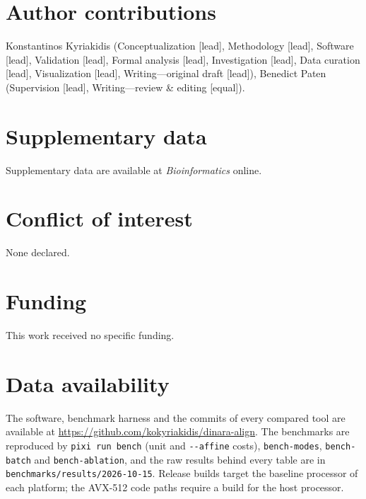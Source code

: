 \section*{Author contributions}
Konstantinos Kyriakidis (Conceptualization [lead], Methodology [lead], Software [lead], Validation [lead], Formal analysis [lead], Investigation [lead], Data curation [lead], Visualization [lead], Writing—original draft [lead]), Benedict Paten (Supervision [lead], Writing—review \& editing [equal]).

\section*{Supplementary data}
Supplementary data are available at \emph{Bioinformatics} online.

\section*{Conflict of interest}
None declared.

\section*{Funding}
This work received no specific funding.

\section*{Data availability}
The software, benchmark harness and the commits of every compared tool are available at \url{https://github.com/kokyriakidis/dinara-align}. The benchmarks are reproduced by \texttt{pixi run bench} (unit and \texttt{-{}-affine} costs), \texttt{bench-modes}, \texttt{bench-batch} and \texttt{bench-ablation}, and the raw results behind every table are in \texttt{benchmarks/results/2026-10-15}. Release builds target the baseline processor of each platform; the AVX-512 code paths require a build for the host processor.
